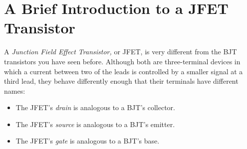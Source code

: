 \section{A Brief Introduction to a JFET Transistor}
\label{lab_jfet}


\bigskip

A \textit{Junction Field Effect Transistor,} or JFET, is very different from the BJT transistors you have seen before.  Although both are three-terminal devices in which a current between two of the leads is controlled by a smaller signal at a third lead, they behave differently enough that their terminals have different names:
\begin{itemize}[nosep]
\item The JFET's  \textit{drain} is analogous to a BJT's collector.
\item The JFET's  \textit{source} is analogous to a BJT's emitter.
\item The JFET's  \textit{gate} is analogous to a BJT's base.
\end{itemize}

